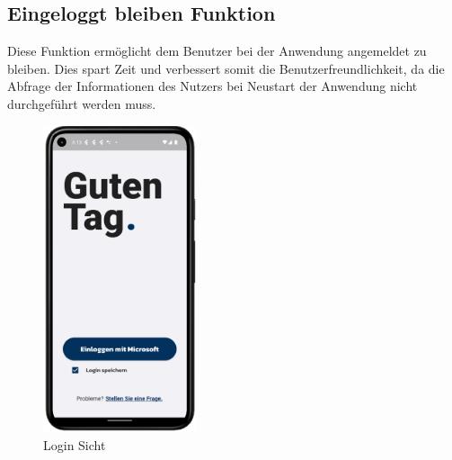 \subsection{Eingeloggt bleiben Funktion}
Diese Funktion ermöglicht dem Benutzer bei der Anwendung angemeldet zu bleiben. Dies spart Zeit und verbessert somit die Benutzerfreundlichkeit, da die Abfrage der Informationen des Nutzers bei Neustart der Anwendung nicht durchgef\"uhrt werden muss.
\begin{figure}[!h]
\centering
\includegraphics[width=0.4\textwidth]{FLUTTER/images/GP/Login_Allg.png}
\caption{Login Sicht}
\end{figure}

\newpage
